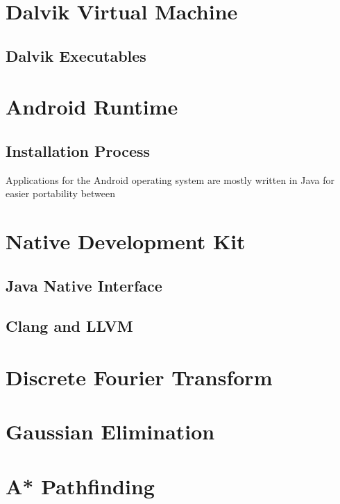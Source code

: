 \section{Dalvik Virtual Machine}


\subsection{Dalvik Executables}



\section{Android Runtime}



\subsection{Installation Process}


Applications for the Android operating system are mostly written in Java for easier portability between \cite[p.~33]{nolan2012decompiling}

\section{Native Development Kit}

\subsection{Java Native Interface}
\subsection{Clang and LLVM}

\section{Discrete Fourier Transform}

\section{Gaussian Elimination}

\section{A* Pathfinding}
